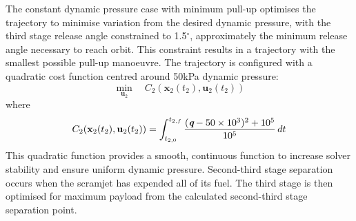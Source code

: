 \documentclass[journal]{new-aiaa}
\begin{document}
	 	 
	 	 The constant dynamic pressure case with minimum pull-up optimises the trajectory to minimise variation from the desired dynamic pressure, with the third stage release angle constrained to 1.5$^\circ$, approximately the minimum release angle necessary to reach orbit. This constraint results in a trajectory with the smallest possible pull-up manoeuvre. 
	 	 The trajectory is configured with a quadratic cost function centred around 50kPa dynamic pressure:
	 	 \begin{equation} 
	 	 \min\limits_{\textbf{u}_2} \quad C_2(\textbf{x}_{2}(t_2),\textbf{u}_{2}(t_2))
	 	 \end{equation}
	 	 where
	 	 \begin{equation}
	 	 C_2(\textbf{x}_{2}(t_2),\textbf{u}_{2}(t_2)) = \int_{t_{2,0}}^{t_{2,f}} \frac{(\textit{\textbf{q}}-50\times 10^3)^2+10^5}{10^5} \, dt
	 	 \end{equation}
	This quadratic function provides a smooth, continuous function to increase solver stability and ensure uniform dynamic pressure. Second-third stage separation occurs when the scramjet has expended all of its fuel.  The third stage is then optimised for maximum payload from the calculated second-third stage separation point. 
	 	 
\end{document}
